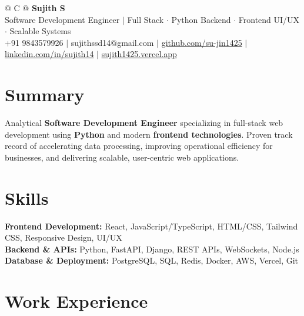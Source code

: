 \documentclass[a4paper,10pt]{article}
\newcommand{\ulink}[2]{\href{#1}{#2}}
\begin{document}
\pagestyle{empty}

\begin{tabularx}{\linewidth}{@{} C @{}}
{\color[HTML]{000000}\fontsize{30}{35}\selectfont\bfseries Sujith S} \\[5pt]
{\fontsize{10.5}{12.5}\selectfont\color[HTML]{3A3A3A}
Software Development Engineer $|$ Full Stack $\cdot$ Python Backend $\cdot$ Frontend UI/UX $\cdot$ Scalable Systems} \\[6pt]
{\fontsize{9.5}{11.5}\selectfont\textcolor[HTML]{3A3A3A}{+91 9843579926 $|$ sujithssd14@gmail.com $|$ \ulink{https://github.com/su-jin1425}{github.com/su-jin1425} $|$ \ulink{https://linkedin.com/in/sujith14}{linkedin.com/in/sujith14} $|$ \ulink{https://sujith1425.vercel.app}{sujith1425.vercel.app}}}
\end{tabularx}

\section{Summary}
\vspace{2pt}
{\color[HTML]{0A0A0A}\fontsize{11}{14}\selectfont
Analytical \textbf{Software Development Engineer} specializing in full-stack web development using \textbf{Python} and modern \textbf{frontend technologies}. Proven track record of accelerating data processing, improving operational efficiency for businesses, and delivering scalable, user-centric web applications.}

\section{Skills}
\vspace{2pt}
{\color[HTML]{0A0A0A}\fontsize{11}{14}\selectfont
\textbf{Frontend Development:} React, JavaScript/TypeScript, HTML/CSS, Tailwind CSS, Responsive Design, UI/UX \\[2pt]
\textbf{Backend \& APIs:} Python, FastAPI, Django, REST APIs, WebSockets, Node.js \\[2pt]
\textbf{Database \& Deployment:} PostgreSQL, SQL, Redis, Docker, AWS, Vercel, Git}

\section{Work Experience}
\vspace{2pt}
\end{document}
